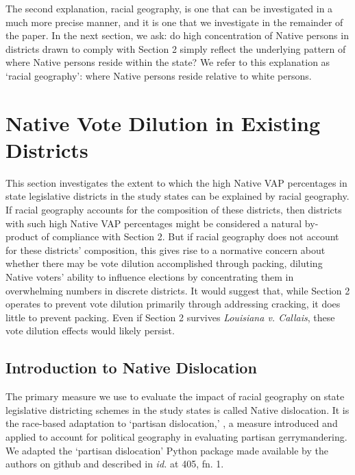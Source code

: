 \documentclass[12pt]{article}
\begin{document}
The second explanation, racial geography, is one that can be investigated in a much more precise manner, and it is one that we investigate in the remainder of the paper.  In the next section, we ask: do high concentration of Native persons in districts drawn to comply with Section 2 simply reflect the underlying pattern of where Native persons reside within the state?  We refer to this explanation as `racial geography': where Native persons reside relative to white persons.

\section{Native Vote Dilution in Existing Districts}

This section investigates the extent to which the high Native VAP percentages in state legislative districts in the study states can be explained by racial geography. If racial geography accounts for the composition of these districts, then districts with such high Native VAP percentages might be considered a natural by-product of compliance with Section 2.  But if racial geography does not account for these districts' composition, this gives rise to a normative concern about whether there may be vote dilution accomplished through packing, diluting Native voters' ability to influence elections by concentrating them in overwhelming numbers in discrete districts.  It would suggest that, while Section 2 operates to prevent vote dilution primarily through addressing cracking, it does little to prevent packing.  Even if Section 2 survives \textit{Louisiana v. Callais}, these vote dilution effects would likely persist.

\subsection{Introduction to Native Dislocation}

The primary measure we use to evaluate the impact of racial geography on state legislative districting schemes in the study states is called Native dislocation. It is the race-based adaptation to `partisan dislocation,' \cite{deford2022partisan}, a measure introduced and applied to account for political geography in evaluating partisan gerrymandering. We adapted the `partisan dislocation' Python package made available by the authors on github and described in \textit{id.} at 405, fn. 1.  
\end{document}
